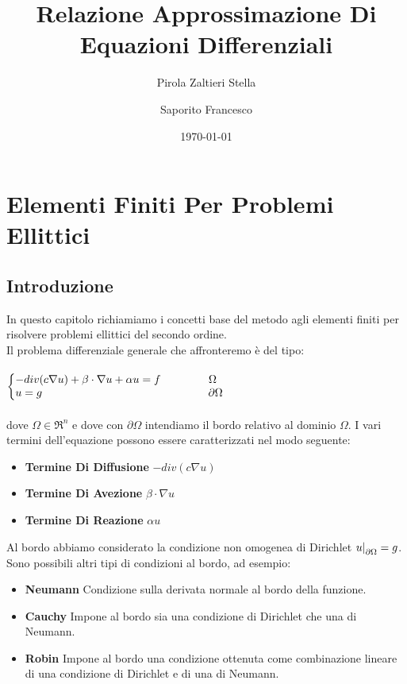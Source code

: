 \documentclass[12pt,a4paper]{report}
\author{Pirola Zaltieri Stella \and Saporito Francesco}
\title{Relazione Approssimazione Di Equazioni Differenziali}
\date{\today}
\makeatletter
\theoremstyle{theorem}
\theoremstyle{theorem}
\theoremstyle{definition}
\newenvironment{system}
{\left\lbrace\begin{array}{@{}l@{}}}
{\end{array}\right.}
\newcommand\restr[2]{{%
  \left.\kern-\nulldelimiterspace %
  #1 %
  \right|_{#2} %
  }}
\makeatother
\begin{document}
\maketitle

\tableofcontents

% 

\chapter{Elementi Finiti Per Problemi Ellittici}

\section{Introduzione}
In questo capitolo richiamiamo i concetti base del metodo agli elementi finiti per risolvere problemi ellittici del secondo ordine.\\
Il problema differenziale generale che affronteremo è del tipo:\\\\  \label{Problema Di Dirichlet}
\begin{math}
\begin{system}
-div(c\nabla{u})+\beta \cdot \nabla{u} + \alpha u = f \qquad \qquad \ \Omega \\
u = g \qquad \qquad \qquad \qquad \qquad \qquad \qquad \quad \partial \Omega \\
\end{system}
\end{math}
\hfill \\\\
dove $\Omega \in \Re^{n}$ e dove con $\partial \Omega$ intendiamo il bordo relativo al dominio $\Omega$. I vari termini dell'equazione possono essere caratterizzati nel modo seguente:
\begin{itemize}
	\item \textbf{Termine Di Diffusione} $-div(c\nabla{u})$
	\item \textbf{Termine Di Avezione} $\beta \cdot \nabla{u}$
	\item \textbf{Termine Di Reazione} $\alpha u$	
\end{itemize}
Al bordo abbiamo considerato la condizione non omogenea di Dirichlet $ \restr{u}{\partial \Omega} = g$. Sono possibili altri tipi di condizioni al bordo, ad esempio:
\begin{itemize}
	\item \textbf{Neumann} Condizione sulla derivata normale al bordo della funzione.
	\item \textbf{Cauchy} Impone al bordo sia una condizione di Dirichlet che una di Neumann.
	\item \textbf{Robin} Impone al bordo una condizione ottenuta come combinazione lineare di una condizione di Dirichlet e di una di Neumann.
\end{itemize}
\end{document}
